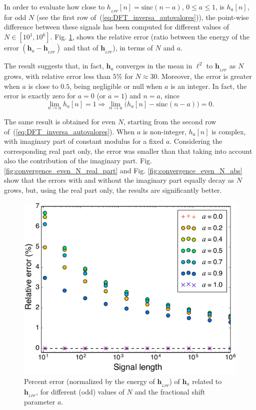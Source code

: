 In order to evaluate how close to $ h_{_{LPF}}[n] = \mathrm{sinc} (n-a) $, $ 0\leq a \leq 1 $, is $h_a[n]$, for odd $N$ (see the first row of~(\ref{eq:DFT_inversa_autovalores})), the point-wise difference between these signals has been computed for different values of $ N \in [10^1, 10^6]$. Fig. \ref{fig:convergence}, shows the relative error (ratio between the energy of the error $(\mathbf{h}_a - \mathbf{h}_{_{LPF}})$ and that of $ \mathbf{h}_{_{LPF}} $), in terms of $ N $ and $a $.

The result suggests that, in fact, $ \mathbf{h}_a $ converges in the mean in $ \ell^2 $ to $ \mathbf{h}_{_{LPF}}$ as $ N $ grows, with relative error less than $ 5\% $ for $ N \approx 30 $. Moreover, the error is greater when $ a $ is close to $ 0{.}5 $, being negligible or null when $ a $ is an integer. In fact, the error is exactly zero for $ a=0$ (or $a=1$) and $ n = a $, since
\begin{equation}\label{eq:lim_h_impar}
    \lim_{n \rightarrow a} h_{a}[n] = 1
    \Rightarrow
    \lim_{n \rightarrow a} \big(h_{a}[n] - \mathrm{sinc}(n-a)\big) = 0.
\end{equation}

The same result is obtained for even $N$, starting from the second row of~(\ref{eq:DFT_inversa_autovalores}). When $a$ is non-integer, $h_a[n] $ is complex, with imaginary part of constant modulus for a fixed $a$. Considering the corresponding real part only, the error was smaller than that taking into account also the contribution of the imaginary part. Fig. \ref{fig:convergence_even_N_real_part} and Fig. \ref{fig:convergence_even_N_abs} show that the errors with and without the imaginary part equally decay as  $ N $ grows, but, using the real part only, the results are significantly better.

\begin{figure}[ht!]
    \centering
    \includegraphics[width=0.5\linewidth]{Figures/convergence_odd_N_V4.pdf}
    \caption{Percent error (normalized by the energy of $ \mathbf{h}_{_{LPF}} $) of $ \mathbf{h}_a $ related to $ \mathbf{h}_{_{LPF}} $, for different (odd) values of $ N $ and the fractional shift parameter $ a $.}
    \label{fig:convergence}
\end{figure}

